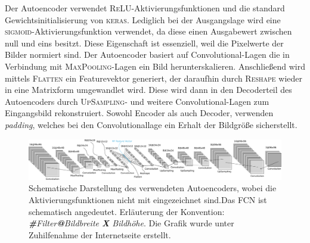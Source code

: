Der Autoencoder verwendet \textsc{ReLU}-Aktivierungsfunktionen
und die standard Gewichtsinitialisierung von \textsc{keras}.
Lediglich bei der Ausgangslage wird eine \textsc{sigmoid}-Aktivierungsfunktion verwendet, da diese einen Ausgabewert zwischen null und eins besitzt. Diese Eigenschaft ist essenziell,
weil die Pixelwerte der Bilder normiert sind.
Der Autoencoder basiert auf Convolutional-Lagen die in Verbindung mit
\textsc{MaxPooling}-Lagen ein Bild herunterskalieren. Anschließend wird
mittels \textsc{Flatten} ein Featurevektor generiert, der daraufhin durch
\textsc{Reshape} wieder in eine Matrixform umgewandlet wird. Diese wird dann
in den Decoderteil des Autoencoders durch \textsc{UpSampling}- und weitere
Convolutional-Lagen zum Eingangsbild rekonstruiert. Sowohl Encoder als auch Decoder,
verwenden \emph{padding}, welches bei den Convolutionallage ein Erhalt der Bildgröße
sicherstellt.
\begin{figure}
\centering
\includegraphics[width=\the\textwidth]{../../final_data/general/autoencoder.pdf}
\caption{Schematische Darstellung des verwendeten Autoencoders, wobei
         die Aktivierungsfunktionen nicht mit eingezeichnet sind.Das FCN
         ist schematisch angedeutet. Erläuterung der Konvention: \emph{\textbf{\#}Filter\textbf{@}Bildbreite \textbf{X} Bildhöhe}.
         Die Grafik wurde unter Zuhilfenahme der Internetseite \cite{net_svg_source} erstellt.}
\label{fig:Autoencoder}
\end{figure}
